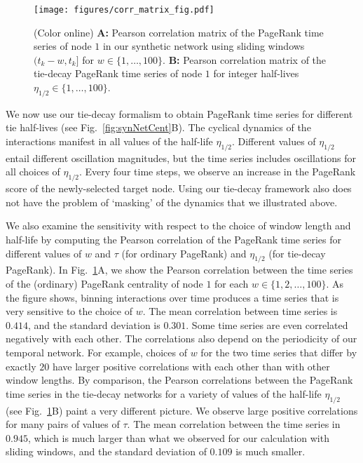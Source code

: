 \documentclass[journal,transmag]{IEEEtran}
\begin{document}
\begin{figure}[tp]
  \centering
  \texttt{[image: figures/corr\_matrix\_fig.pdf]}
  \caption{(Color online) {\bf A:} Pearson correlation matrix of the PageRank time series of
    node $1$ in our synthetic network using sliding windows $(t_k - w, t_k]$ for $w \in \{1, \ldots,
    100\}$.  {\bf B:} Pearson correlation matrix of the tie-decay PageRank time series
  of node $1$ for integer half-lives $\eta_{1/2} \in \{1, \ldots, 100\}$.
  }
  \label{fig:corrMatrices}
\end{figure}


We now use our tie-decay formalism to obtain PageRank time series for
different tie half-lives (see Fig.~\ref{fig:synNetCent}B). The
cyclical dynamics of the interactions manifest in all values of the
half-life $\eta_{1/2}$. Different values of $\eta_{1/2}$ entail
different oscillation magnitudes, but the time series includes
oscillations for all choices of $\eta_{1/2}$. Every four time steps,
we observe an increase in the PageRank score of the newly-selected
target node. Using our tie-decay framework also does not have the
problem of `masking' of the dynamics that we illustrated above.

We also examine the sensitivity with respect to the choice of window length and
half-life by computing the Pearson correlation of the PageRank time
series for different values of $w$ and $\tau$ (for ordinary PageRank) and $\eta_{1/2}$ (for tie-decay PageRank). In Fig.~\ref{fig:corrMatrices}A, we show the Pearson correlation between the time series of the (ordinary) PageRank centrality of node $1$ for
each $w \in \{1, 2, \ldots, 100\}$. As the figure shows, binning
interactions over time produces a time series that is very sensitive
to the choice of $w$. The mean correlation between time series is
$0.414$, and the standard deviation is $0.301$. Some time series are
even correlated negatively with each other.  The correlations also
depend on the periodicity of our temporal network. For example,
choices of $w$ for the two time series that differ by exactly $20$
have larger positive correlations with each other than with other
window lengths. By comparison, the Pearson correlations between the
PageRank time series in the tie-decay networks for a variety of values
of the half-life $\eta_{1/2}$ (see Fig.~\ref{fig:corrMatrices}B) paint a very
different picture. We observe large positive
correlations for many pairs of values of $\tau$. The mean correlation
between the time series in $0.945$, which is much larger than what we
observed for our calculation with sliding windows, and the standard
deviation of $0.109$ is much smaller.
\end{document}
